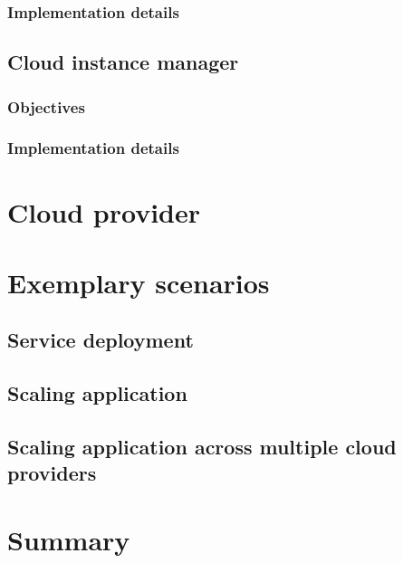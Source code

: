 \subsubsection{Implementation details}


\subsection{Cloud instance manager}

\subsubsection{Objectives}
\subsubsection{Implementation details}


\section{Cloud provider}

\section{Exemplary scenarios}

\subsection{Service deployment}

\subsection{Scaling application}

\subsection{Scaling application across multiple cloud providers}

\section{Summary}

